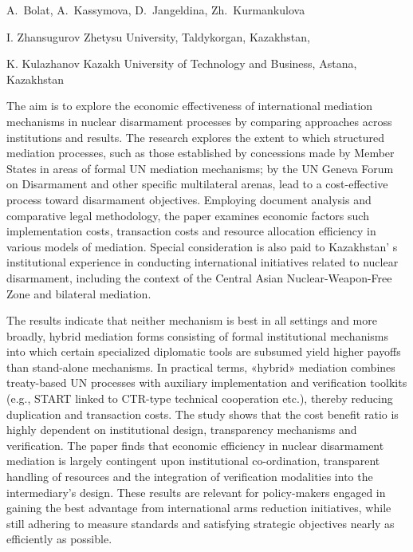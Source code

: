 
\begin{header}

A.~Bolat,
A.~Kassymova\envelope,
D.~Jangeldina,
Zh.~Kurmankulova
\end{header}

\begin{affil}
I. Zhansugurov Zhetysu University, Taldykorgan, Kazakhstan,

K. Kulazhanov Kazakh University of Technology and Business, Astana, Kazakhstan

\end{affil}

The aim is to explore the economic effectiveness of international
mediation mechanisms in nuclear disarmament processes by comparing
approaches across institutions and results. The research explores the
extent to which structured mediation processes, such as those
established by concessions made by Member States in areas of formal UN
mediation mechanisms; by the UN Geneva Forum on Disarmament and other
specific multilateral arenas, lead to a cost-effective process toward
disarmament objectives. Employing document analysis and comparative
legal methodology, the paper examines economic factors such
implementation costs, transaction costs and resource allocation
efficiency in various models of mediation. Special consideration is also
paid to Kazakhstan' s institutional experience in
conducting international initiatives related to nuclear disarmament,
including the context of the Central Asian Nuclear-Weapon-Free Zone and
bilateral mediation.

The results indicate that neither mechanism is best in all settings and
more broadly, hybrid mediation forms consisting of formal institutional
mechanisms into which certain specialized diplomatic tools are subsumed
yield higher payoffs than stand-alone mechanisms. In practical terms,
«hybrid» mediation combines treaty-based UN processes with auxiliary
implementation and verification toolkits (e.g., START linked to CTR-type
technical cooperation etc.), thereby reducing duplication and
transaction costs. The study shows that the cost benefit ratio is highly
dependent on institutional design, transparency mechanisms and
verification. The paper finds that economic efficiency in nuclear
disarmament mediation is largely contingent upon institutional
co-ordination, transparent handling of resources and the integration of
veri\-fication modalities into the intermediary's design. These results
are relevant for policy-makers engaged in gaining the best advantage
from international arms reduction initiatives, while still adhering to
measure standards and satisfying strategic objectives nearly as
efficiently as possible.

